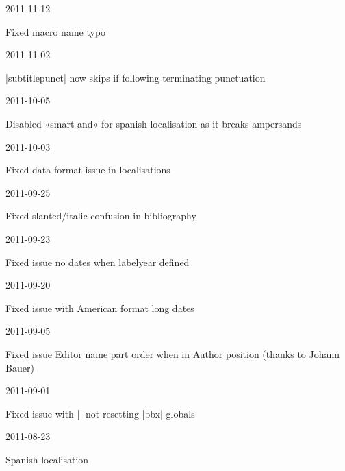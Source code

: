 \documentclass{ltxdockit}
\begin{document}
\begin{changelog}
\begin{release}{4.2}{2011-11-12}
\item Fixed macro name typo
\end{release}

\begin{release}{4.1}{2011-11-02}
\item |subtitlepunct| now skips if following terminating punctuation
\end{release}

\begin{release}{4.0}{2011-10-05}
\item Disabled «smart and» for spanish localisation as it breaks ampersands
\end{release}

\begin{release}{3.9}{2011-10-03}
\item Fixed data format issue in localisations
\end{release}

\begin{release}{3.8}{2011-09-25}
\item Fixed slanted/italic confusion in bibliography
\end{release}

\begin{release}{3.7}{2011-09-23}
\item Fixed issue no dates when labelyear defined
\end{release}

\begin{release}{3.6}{2011-09-20}
\item Fixed issue with American format long dates
\end{release}

\begin{release}{3.5}{2011-09-05}
\item Fixed issue Editor name part order when in Author position (thanks to
  Johann Bauer)
\end{release}

\begin{release}{3.4}{2011-09-01}
\item Fixed issue with |\fullcite| not resetting |bbx| globals
\end{release}

\begin{release}{3.3}{2011-08-23}
\item Spanish localisation
\end{release}


\end{changelog}
\end{document}
